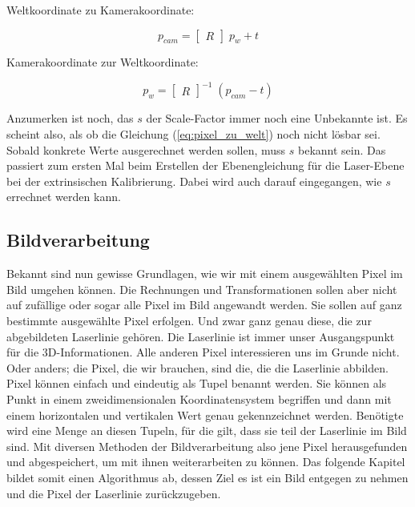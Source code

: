 		Weltkoordinate zu Kamerakoordinate:
		
		\begin{equation}
			p_{cam} = \begin{bmatrix} R \end{bmatrix} \; p_w + t
			\label{eq:welt_zu_kamera}
		\end{equation}
		
		Kamerakoordinate zur Weltkoordinate:
		
		\begin{equation}
			p_w = \begin{bmatrix} R \end{bmatrix}^{-1} \; (p_{cam} - t)
			\label{eq:kamera_zu_welt}
		\end{equation}
		
		Anzumerken ist noch, das \( s \) der Scale-Factor immer noch eine Unbekannte ist. Es scheint also, als ob die Gleichung (\ref{eq:pixel_zu_welt}) noch nicht lösbar sei. Sobald konkrete Werte ausgerechnet werden sollen, muss \( s \) bekannt sein. Das passiert zum ersten Mal beim Erstellen der Ebenengleichung für die Laser-Ebene bei der extrinsischen Kalibrierung. Dabei wird auch darauf eingegangen, wie \( s \) errechnet werden kann.  
	\subsection{Bildverarbeitung}
	Bekannt sind nun gewisse Grundlagen, wie wir mit einem ausgewählten Pixel im Bild umgehen können. Die Rechnungen und Transformationen sollen aber nicht auf zufällige oder sogar alle Pixel im Bild angewandt werden. Sie sollen auf ganz bestimmte ausgewählte Pixel erfolgen. Und zwar ganz genau diese, die zur abgebildeten Laserlinie gehören. Die Laserlinie ist immer unser Ausgangspunkt für die 3D-Informationen. Alle anderen Pixel interessieren uns im Grunde nicht. Oder anders; die Pixel, die wir brauchen, sind die, die die Laserlinie abbilden. \newline
	Pixel können einfach und eindeutig als Tupel benannt werden. Sie können als Punkt in einem zweidimensionalen Koordinatensystem begriffen und dann mit einem horizontalen und vertikalen Wert genau gekennzeichnet werden. Benötigte wird eine Menge an diesen Tupeln, für die gilt, dass sie teil der Laserlinie im Bild sind. Mit diversen Methoden der Bildverarbeitung also jene Pixel herausgefunden und abgespeichert, um mit ihnen weiterarbeiten zu können. Das folgende Kapitel bildet somit einen Algorithmus ab, dessen Ziel es ist ein Bild entgegen zu nehmen und die Pixel der Laserlinie zurückzugeben. 
	
